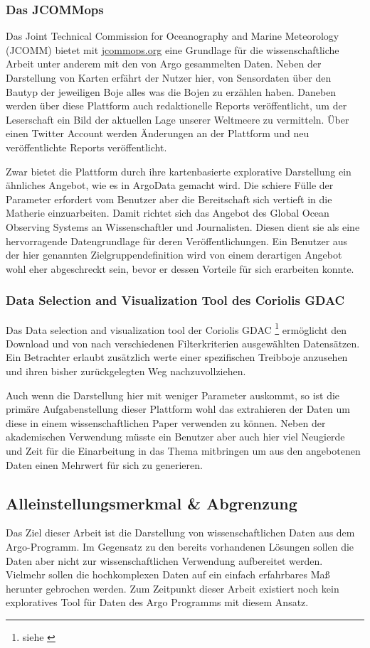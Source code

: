 \subsubsection{Das JCOMMops} 

Das Joint Technical Commission for Oceanography and Marine Meteorology (JCOMM) bietet mit 
\url{jcommops.org} eine Grundlage für die wissenschaftliche Arbeit unter anderem mit den von Argo gesammelten Daten. Neben der Darstellung von Karten erfährt der Nutzer hier, von Sensordaten über den Bautyp der jeweiligen Boje alles was die Bojen zu erzählen haben. Daneben werden über diese Plattform auch redaktionelle Reports veröffentlicht, um der Leserschaft ein Bild der aktuellen Lage unserer Weltmeere zu vermitteln. Über einen Twitter Account werden Änderungen an der Plattform und neu veröffentlichte Reports veröffentlicht. 

Zwar bietet die Plattform durch ihre kartenbasierte explorative Darstellung ein ähnliches Angebot, wie es in ArgoData gemacht wird. Die schiere Fülle der Parameter erfordert vom Benutzer aber die Bereitschaft sich vertieft in die Matherie einzuarbeiten. Damit richtet sich das Angebot des Global Ocean Observing Systems an Wissenschaftler und Journalisten. Diesen dient sie als eine hervorragende Datengrundlage für deren Veröffentlichungen. Ein Benutzer aus der hier genannten Zielgruppendefinition wird von einem derartigen Angebot wohl eher abgeschreckt sein, bevor er dessen Vorteile für sich erarbeiten konnte. 

\subsubsection{Data Selection and Visualization Tool des Coriolis GDAC}

Das Data selection and visualization tool der Coriolis GDAC \footnote { siehe \cite{ArgoDataSelection}} ermöglicht den Download und von nach verschiedenen Filterkriterien ausgewählten Datensätzen. Ein Betrachter erlaubt zusätzlich werte einer spezifischen Treibboje anzusehen und ihren bisher zurückgelegten Weg nachzuvollziehen.

Auch wenn die Darstellung hier mit weniger Parameter auskommt, so ist die primäre Aufgabenstellung dieser Plattform wohl das extrahieren der Daten um diese in einem wissenschaftlichen Paper verwenden zu können. Neben der akademischen Verwendung müsste ein Benutzer aber auch hier viel Neugierde und Zeit für die Einarbeitung in das Thema mitbringen um aus den angebotenen Daten einen Mehrwert für sich zu generieren. 


\subsection{Alleinstellungsmerkmal \& Abgrenzung}

Das Ziel dieser Arbeit ist die Darstellung von wissenschaftlichen Daten aus dem Argo-Programm. Im Gegensatz zu den bereits vorhandenen Lösungen sollen die Daten aber nicht zur wissenschaftlichen Verwendung aufbereitet werden. Vielmehr sollen die hochkomplexen Daten auf ein einfach erfahrbares Maß herunter gebrochen werden. Zum Zeitpunkt dieser Arbeit existiert noch kein exploratives Tool für Daten des Argo Programms mit diesem Ansatz.


